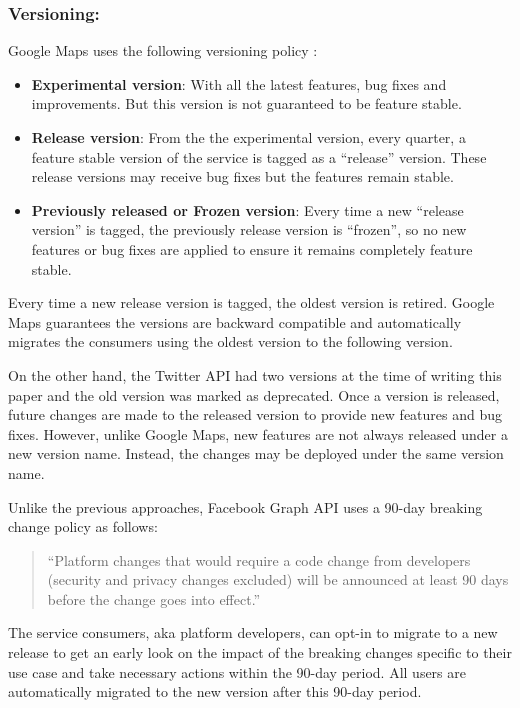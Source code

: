\documentclass[runningheads,a4paper]{llncs}
\begin{document}
\subsubsection{Versioning:} %
\label{sub:versioning}
Google Maps uses the following versioning policy \cite{google_maps_versioning}:

\begin{itemize}
  \item \textbf{Experimental version}: With all the latest features, bug fixes and improvements. But this version is not guaranteed to be feature stable.
  \item \textbf{Release version}: From the the experimental version, every quarter, a feature stable version of the service is tagged as a ``release'' version. These release versions may receive bug fixes but the features remain stable.
  \item \textbf{Previously released or Frozen version}: Every time a new ``release version'' is tagged, the previously release version is ``frozen'', so no new features or bug fixes are applied to ensure it remains completely feature stable.
\end{itemize}
Every time a new release version is tagged, the oldest version is retired. Google Maps guarantees the versions are backward compatible and automatically migrates the consumers using the oldest version to the following version.

On the other hand, the Twitter API had two versions at the time of writing this paper \cite{twitter_api} and the old version was marked as deprecated. Once a version is released, future changes are made to the released version to provide new features and bug fixes. However, unlike Google Maps, new features are not always released under a new version name. Instead, the changes may be deployed under the same version name.

Unlike the previous approaches, Facebook Graph API uses a 90-day breaking change policy as follows: \cite{facebook_api}

\begin{quote}
``Platform changes that would require a code change from developers (security and privacy changes excluded) will be announced at least 90 days before the change goes into effect.''
\end{quote}

The service consumers, aka platform developers, can opt-in to migrate to a new release to get an early look on the impact of the breaking changes specific to their use case and take necessary actions within the 90-day period. All users are automatically migrated to the new version after this 90-day period.
\end{document}
